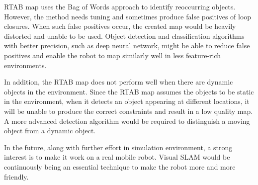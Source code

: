 \documentclass[10pt,journal,compsoc]{IEEEtran}
\begin{document}
RTAB map uses the Bag of Words approach to identify reoccurring objects. However, the method needs tuning and sometimes produce false positives of loop closures. When such false positives occur, the created map would be heavily distorted and unable to be used. Object detection and classification algorithms with better precision, such as deep neural network, might be able to reduce false positives and enable the robot to map similarly well in less feature-rich environments.

In addition, the RTAB map does not perform well when there are dynamic objects in the environment. Since the RTAB map assumes the objects to be static in the environment, when it detects an object appearing at different locations, it will be unable to produce the correct constraints and result in a low quality map. A more advanced detection algorithm would be required to distinguish a moving object from a dynamic object.

In the future, along with further effort in simulation environment, a strong interest is to make it work on a real mobile robot. Visual SLAM would be continuously being an essential technique to make the robot more and more friendly.
\end{document}
